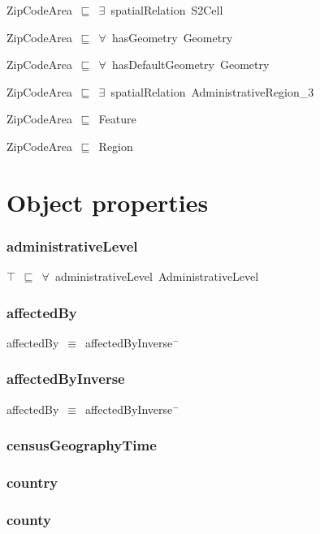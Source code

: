 \documentclass{article}
\begin{document}
ZipCodeArea~\ensuremath{\sqsubseteq}~\ensuremath{\exists}~spatialRelation~S2Cell~

ZipCodeArea~\ensuremath{\sqsubseteq}~\ensuremath{\forall}~hasGeometry~Geometry~

ZipCodeArea~\ensuremath{\sqsubseteq}~\ensuremath{\forall}~hasDefaultGeometry~Geometry~

ZipCodeArea~\ensuremath{\sqsubseteq}~\ensuremath{\exists}~spatialRelation~AdministrativeRegion\_3~

ZipCodeArea~\ensuremath{\sqsubseteq}~Feature~

ZipCodeArea~\ensuremath{\sqsubseteq}~Region~

\section*{Object properties}\subsubsection*{administrativeLevel}

\ensuremath{\top}~\ensuremath{\sqsubseteq}~\ensuremath{\forall}~administrativeLevel~AdministrativeLevel

\subsubsection*{affectedBy}

affectedBy~\ensuremath{\equiv}~affectedByInverse\ensuremath{^-}

\subsubsection*{affectedByInverse}

affectedBy~\ensuremath{\equiv}~affectedByInverse\ensuremath{^-}

\subsubsection*{censusGeographyTime}

\subsubsection*{country}

\subsubsection*{county}
\end{document}
